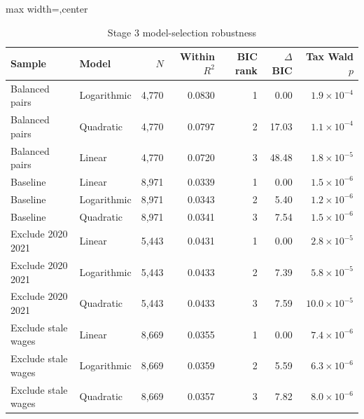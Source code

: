 \begin{table}[H]
\centering
\scriptsize
\caption{Stage 3 model-selection robustness}
\label{tab:app_stage3_robustness}
\begin{adjustbox}{max width=\textwidth,center}
\begin{tabular}{@{}llrrrrr@{}}
\toprule
Sample & Model & $N$ & Within $R^2$ & BIC rank & $\Delta$BIC & Tax Wald $p$ \\
\midrule
Balanced pairs & Logarithmic & 4,770 & 0.0830 & 1 &  0.00 & $1.9 \times 10^{-4}$ \\
Balanced pairs & Quadratic & 4,770 & 0.0797 & 2 & 17.03 & $1.1 \times 10^{-4}$ \\
Balanced pairs & Linear & 4,770 & 0.0720 & 3 & 48.48 & $1.8 \times 10^{-5}$ \\
Baseline & Linear & 8,971 & 0.0339 & 1 &  0.00 & $1.5 \times 10^{-6}$ \\
Baseline & Logarithmic & 8,971 & 0.0343 & 2 &  5.40 & $1.2 \times 10^{-6}$ \\
Baseline & Quadratic & 8,971 & 0.0341 & 3 &  7.54 & $1.5 \times 10^{-6}$ \\
Exclude 2020 2021 & Linear & 5,443 & 0.0431 & 1 &  0.00 & $2.8 \times 10^{-5}$ \\
Exclude 2020 2021 & Logarithmic & 5,443 & 0.0433 & 2 &  7.39 & $5.8 \times 10^{-5}$ \\
Exclude 2020 2021 & Quadratic & 5,443 & 0.0433 & 3 &  7.59 & $10.0 \times 10^{-5}$ \\
Exclude stale wages & Linear & 8,669 & 0.0355 & 1 &  0.00 & $7.4 \times 10^{-6}$ \\
Exclude stale wages & Logarithmic & 8,669 & 0.0359 & 2 &  5.59 & $6.3 \times 10^{-6}$ \\
Exclude stale wages & Quadratic & 8,669 & 0.0357 & 3 &  7.82 & $8.0 \times 10^{-6}$ \\
\bottomrule
\end{tabular}
\end{adjustbox}
\end{table}
